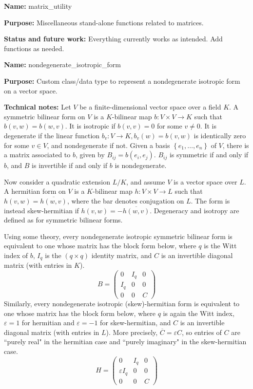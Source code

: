 \documentclass[12pt]{article}
\newcommand{\eps}{\varepsilon}
\newcommand{\lb}{\left\{}
\newcommand{\rb}{\right\}}
\newcommand{\tbf}{\textbf}
\newcommand{\ov}{\overline}
\begin{document}
\begin{mdframed}[linecolor=black]
\tbf{Name:} matrix\_utility

\tbf{Purpose:} Miscellaneous stand-alone functions related to matrices.

\tbf{Status and future work:} Everything currently works as intended. Add functions as needed.
\end{mdframed}

\begin{mdframed}[linecolor=red]
\tbf{Name:} nondegenerate\_isotropic\_form

\smallskip

\tbf{Purpose:} Custom class/data type to represent a nondegenerate isotropic form on a vector space.

\smallskip

\tbf{Technical notes:} Let $V$ be a finite-dimensional vector space over a field $K$. A symmetric bilinear form on $V$ is a $K$-bilinear map $b:V \times V \to K$ such that $b(v,w) = b(w,v)$. It is isotropic if $b(v,v) = 0$ for some $v \neq 0$. It is degenerate if the linear function $b_v:V \to K, b_v(w) = b(v,w)$ is identically zero for some $v \in V$, and nondegenerate if not. Given a basis $\lb e_1, \ldots, e_n \rb$ of $V$, there is a matrix associated to $b$, given by $B_{ij} = b(e_i, e_j)$. $B_{ij}$ is symmetric if and only if $b$, and $B$ is invertible if and only if $b$ is nondegenerate.

\smallskip
\smallskip

Now consider a quadratic extension $L/K$, and assume $V$ is a vector space over $L$. A hermitian form on $V$ is a $K$-bilinear map $h:V \times V \to L$ such that $h(v,w) = \ov{h(w,v)}$, where the bar denotes conjugation on $L$. The form is instead skew-hermitian if $h(v,w) = -\ov{h(w,v)}$. Degeneracy and isotropy are defined as for symmetric bilinear forms.

\smallskip
\smallskip

Using some theory, every nondegenerate isotropic symmetric bilinear form is equivalent to one whose matrix has the block form below, where $q$ is the Witt index of $b$, $I_q$ is the $(q \times q)$ identity matrix, and $C$ is an invertible diagonal matrix (with entries in $K$).
\[
	B = \begin{pmatrix}
		0 & I_q & 0 \\
		I_q & 0 & 0 \\
		0 & 0 & C
	\end{pmatrix}
\]
Similarly, every nondegenerate isotropic (skew)-hermitian form is equivalent to one whose matrix has the block form below, where $q$ is again the Witt index, $\eps = 1$ for hermitian and $\eps = -1$ for skew-hermitian, and $C$ is an invertible diagonal matrix (with entries in $L$). More precisely, $\ov C = \eps C$, so entries of $C$ are ``purely real" in the hermitian case and ``purely imaginary" in the skew-hermitian case.
\[
	H = \begin{pmatrix}
		0 & I_q & 0 \\
		\eps I_q & 0 & 0 \\
		0 & 0 & C
	\end{pmatrix}
\]
\smallskip


\end{mdframed}
\end{document}
